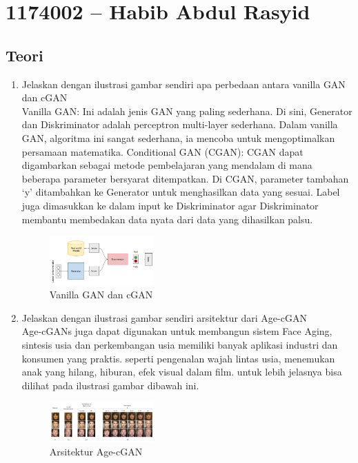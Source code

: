 \section{1174002 – Habib Abdul Rasyid}

\subsection{Teori}
\begin{enumerate}
\item Jelaskan dengan ilustrasi gambar sendiri apa perbedaan antara vanilla GAN dan cGAN\\
Vanilla GAN: Ini adalah jenis GAN yang paling sederhana. 
Di sini, Generator dan Diskriminator adalah perceptron multi-layer sederhana. 
Dalam vanilla GAN, algoritma ini sangat sederhana, ia mencoba untuk mengoptimalkan persamaan matematika. 
Conditional GAN (CGAN): CGAN dapat digambarkan sebagai metode pembelajaran yang mendalam di mana beberapa parameter 
bersyarat ditempatkan. Di CGAN, parameter tambahan ‘y’ ditambahkan ke Generator untuk menghasilkan data yang sesuai. 
Label juga dimasukkan ke dalam input ke Diskriminator agar Diskriminator membantu membedakan data nyata dari data yang 
dihasilkan palsu.

\begin{figure}[H]
\includegraphics[width=4cm]{figures/1174002/9/1.png}
\centering
\caption{Vanilla GAN dan cGAN}
\end{figure}

\item Jelaskan dengan ilustrasi gambar sendiri arsitektur dari Age-cGAN\\
Age-cGANs juga dapat digunakan untuk membangun sistem Face Aging, 
sintesis usia dan perkembangan usia memiliki banyak aplikasi industri dan konsumen yang praktis.
seperti pengenalan wajah lintas usia, menemukan anak yang hilang, hiburan, efek visual dalam film.
untuk lebih jelasnya bisa dilihat pada ilustrasi gambar dibawah ini.

\begin{figure}[H]
\includegraphics[width=4cm]{figures/1174002/9/2.png}
\centering
\caption{Arsitektur Age-cGAN}
\end{figure}


\end{enumerate}
